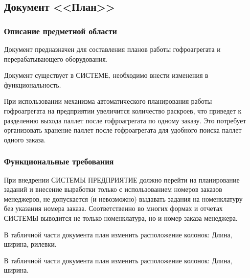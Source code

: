 \subsection{Документ <<План>>}
\label{doc:Plan}

\subsubsection{Описание предметной области}

Документ предназначен для составления планов работы гофроагрегата и перерабатывающего оборудования.

Документ существует в СИСТЕМЕ, необходимо внести изменения в функциональность.

При использовании механизма автоматического планирования работы гофроагрегата на предприятии увеличится количество раскроев, что приведет к разделению выхода паллет после гофроагрегата по одному заказу. 
Это потребует  организовать хранение паллет после гофроагрегата для удобного поиска паллет одного заказа. 

\subsubsection{Функциональные требования}


При внедрении СИСТЕМЫ ПРЕДПРИЯТИЕ должно перейти на планирование заданий и внесение выработки только с использованием номеров заказов менеджеров, не допускается (и невозможно) выдавать задания на номенклатуру без указания номера заказа.
Соответственно во многих формах и отчетах СИСТЕМЫ выводится не только номенклатура, но и номер заказа менеджера.


В табличной части документа план изменить расположение колонок: 
Длина, ширина, рилевки.


В табличной части документа план изменить расположение колонок: 
Длина, ширина.





